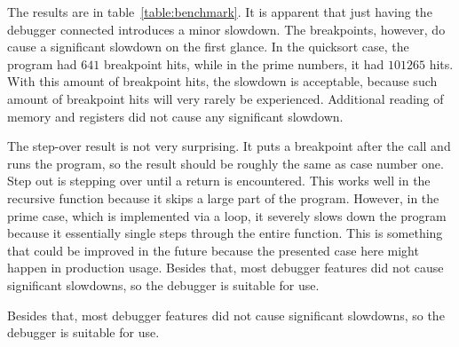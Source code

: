 The results are in table~\ref{table:benchmark}. It is apparent that just having
the debugger connected introduces a minor slowdown. The breakpoints, however,
do cause a significant slowdown on the first glance. In the quicksort case, the
program had $641$ breakpoint hits, while in the prime numbers, it had $101265$
hits. With this amount of breakpoint hits, the slowdown is acceptable, because
such amount of breakpoint hits will very rarely be experienced. Additional
reading of memory and registers did not cause any significant slowdown.

The step-over result is not very surprising. It puts a breakpoint after the
call and runs the program, so the result should be roughly the same as case
number one. Step out is stepping over until a return is encountered. This works
well in the recursive function because it skips a large part of the program.
However, in the prime case, which is implemented via a loop, it severely slows
down the program because it essentially single steps through the entire
function. This is something that could be improved in the future because the
presented case here might happen in production usage. Besides that, most
debugger features did not cause significant slowdowns, so the debugger is
suitable for use.

Besides that, most debugger features did not cause significant slowdowns, so
the debugger is suitable for use.
